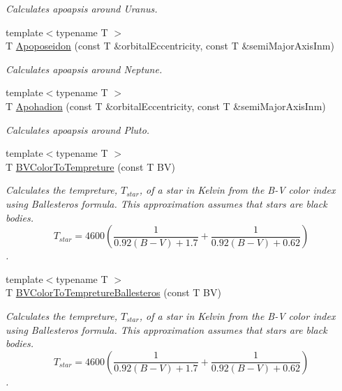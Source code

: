 \begin{DoxyCompactItemize}
\begin{DoxyCompactList}\small\item\em Calculates apoapsis around Uranus. \end{DoxyCompactList}\item 
{\footnotesize template$<$typename T $>$ }\\T \mbox{\hyperlink{group___e_g_x_phys-_apoapsis_ga985afde0717360cffc6b5c17c9a42ac8}{Apoposeidon}} (const T \&orbital\+Eccentricity, const T \&semi\+Major\+Axis\+Inm)
\begin{DoxyCompactList}\small\item\em Calculates apoapsis around Neptune. \end{DoxyCompactList}\item 
{\footnotesize template$<$typename T $>$ }\\T \mbox{\hyperlink{group___e_g_x_phys-_apoapsis_ga9e2578ab880b46f0736936608710f4ad}{Apohadion}} (const T \&orbital\+Eccentricity, const T \&semi\+Major\+Axis\+Inm)
\begin{DoxyCompactList}\small\item\em Calculates apoapsis around Pluto. \end{DoxyCompactList}\item 
{\footnotesize template$<$typename T $>$ }\\T \mbox{\hyperlink{group___e_g_x_phys-_astrophysic-_b-_v_color_gad251a8c25285f5817e307c35c3ec971a}{B\+V\+Color\+To\+Tempreture}} (const T BV)
\begin{DoxyCompactList}\small\item\em Calculates the tempreture, $T_{star}$, of a star in Kelvin from the B-\/V color index using Ballesteros\textquotesingle{} formula. This approximation assumes that stars are black bodies. \[T_{star}=4600 \left ( \frac{1}{0.92 (B-V)+ 1.7} + \frac{1}{0.92 (B-V) + 0.62} \right )\]. \end{DoxyCompactList}\item 
{\footnotesize template$<$typename T $>$ }\\T \mbox{\hyperlink{group___e_g_x_phys-_astrophysic-_b-_v_color_ga0e553143a3bb121c3ae50ca96c502140}{B\+V\+Color\+To\+Tempreture\+Ballesteros}} (const T BV)
\begin{DoxyCompactList}\small\item\em Calculates the tempreture, $T_{star}$, of a star in Kelvin from the B-\/V color index using Ballesteros\textquotesingle{} formula. This approximation assumes that stars are black bodies. \[T_{star}=4600 \left ( \frac{1}{0.92 (B-V)+ 1.7} + \frac{1}{0.92 (B-V) + 0.62} \right )\]. \end{DoxyCompactList}\item 

\end{DoxyCompactItemize}
